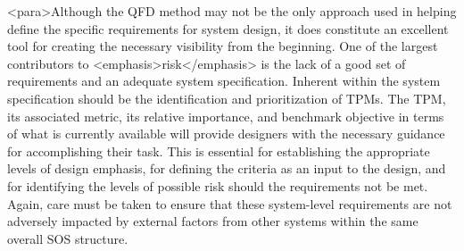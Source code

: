 <para>Although the QFD method may not be the only approach used in helping define the specific requirements for system design, it does constitute an excellent tool for creating the necessary visibility from the beginning. One of the largest contributors to <emphasis>risk</emphasis> is the lack of a good set of requirements and an adequate system specification. Inherent within the system specification should be the identification and prioritization of TPMs. The TPM, its associated metric, its relative importance, and benchmark objective in terms of what is currently available will provide designers with the necessary guidance for accomplishing their task. This is essential for establishing the appropriate levels of design emphasis, for defining the criteria as an input to the design, and for identifying the levels of possible risk should the requirements not be met. Again, care must be taken to ensure that these system-level requirements are not adversely impacted by external factors from other systems within the same overall SOS structure.